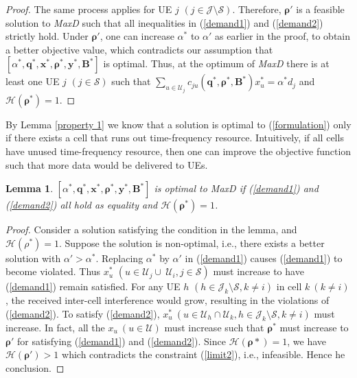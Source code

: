 \documentclass[10pt,journal,final,finalsubmission,twocolumn]{IEEEtran}
\newtheorem{lemma}[theorem]{Lemma}
\begin{document}
\begin{proof}
The same process applies for UE $j$ $(j\in \mathcal{J}\setminus\mathcal{S})$. Therefore, $\boldsymbol{\rho}'$ is a feasible solution to {\em MaxD} such that all inequalities in (\ref{demand1}) and (\ref{demand2}) strictly hold. Under $\boldsymbol{\rho}'$, one can increase $\alpha^*$ to $\alpha '$ as earlier in the proof, to obtain a better objective value, which contradicts our assumption that $[\alpha ^*, \boldsymbol{q}^*,\boldsymbol{x}^*,\boldsymbol{\rho}^*, \boldsymbol{y}^*,\boldsymbol{B}^*]$ is optimal.
Thus, at the optimum of {\em MaxD} there is at least one UE $j$ $(j\in \mathcal{S})$ such that $\sum_{u\in \mathcal{U}_j} c_{ju}\left (\boldsymbol{q}^*,\boldsymbol{ \rho}^*, \boldsymbol{B}^*\right )x_u^*= \alpha^* d_j$ and $\mathcal{H}(\boldsymbol{\rho^*}) = 1$.
\end{proof}

By Lemma \ref{property 1} we know that a solution is optimal to (\ref{formulation}) only if there exists a cell that runs out time-frequency resource. Intuitively, if all cells have unused time-frequency resource, then one can improve the objective function such that more data would be delivered to UEs. 

\begin{lemma}\label{property 2}
$[\alpha ^*, \boldsymbol{q}^*,\boldsymbol{x}^*,\boldsymbol{\rho}^*, \boldsymbol{y}^*,\boldsymbol{B}^*]$ is optimal to MaxD if (\ref{demand1}) and (\ref{demand2}) all hold as equality and $\mathcal{H}(\boldsymbol{\rho^*}) = 1$.
\end{lemma}
\begin{proof}
Consider a solution satisfying the condition in the lemma, and $\mathcal{H}(\rho^*)=1$. Suppose the solution is non-optimal, i.e., there exists a better solution with $\alpha'>\alpha^*$. Replacing $\alpha^*$ by $\alpha '$ in (\ref{demand1}) causes (\ref{demand1}) to become violated. Thus $x_u^*$ $(u\in \mathcal{U}_j \cup\ \mathcal{U}_i, j\in \mathcal{S})$ must increase to have (\ref{demand1}) remain satisfied. For any UE $h$ $(h\in \mathcal{J}_k\setminus \mathcal{S},k\neq i)$ in cell $k\ (k\neq i)$, the received inter-cell interference would grow, resulting in the violations of (\ref{demand2}). To satisfy (\ref{demand2}), $x_u^*\ ( u\in \mathcal{U}_h\cap \mathcal{U}_k, h\in \mathcal{J}_k\setminus \mathcal{S},k\neq i)$ must increase. In fact, all the $x_u\ (u\in\mathcal{U})$ must increase such that $\boldsymbol{\rho}^*$ must increase to $\boldsymbol{\rho}'$ for satisfying (\ref{demand1}) and (\ref{demand2}). Since $\mathcal{H}(\boldsymbol{\rho}*)=1$, we have $\mathcal{H}(\boldsymbol{\rho}')>1$ which contradicts the constraint (\ref{limit2}), i.e., infeasible. Hence he conclusion.
\end{proof}
\end{document}
